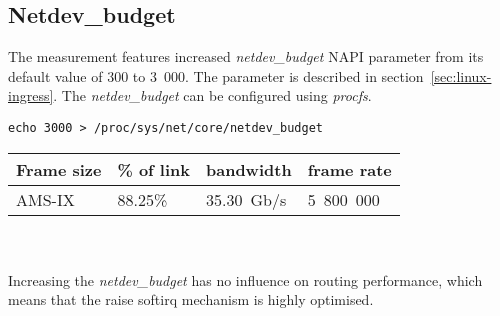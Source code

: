 
\subsection{Netdev\_budget}
The measurement features increased {\it{netdev\_budget}} NAPI parameter from its default value of 300 to 3~000.
The parameter is described in section~\ref{sec:linux-ingress}.
The {\it{netdev\_budget}} can be configured using {\it{procfs}}.
\begin{lstlisting}
echo 3000 > /proc/sys/net/core/netdev_budget
\end{lstlisting}

\begin{tabular}{ | l | l | l | l | }
\hline
Frame size & \% of link & bandwidth & frame rate \\
\hline
AMS-IX & 88.25\% & 35.30~Gb/s & 5~800~000 \\
\hline
\end{tabular}
\\
\\
Increasing the {\it{netdev\_budget}} has no influence on routing performance,
which means that the raise softirq mechanism is highly optimised.
